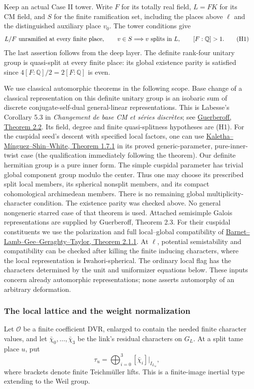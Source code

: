 Keep an actual Case II tower. Write \(F\) for its totally real
field, \(L=FK\) for its CM field, and \(S\) for the finite
ramification set, including the places above \(\ell\) and the
distinguished auxiliary place \(v_0\).
The tower conditions give
\[
 L/F\ \hbox{unramified at every finite place},\qquad
 v\in S\Longrightarrow v\ \hbox{splits in }L,\qquad
 [F:\mathbb Q]>1 .
 \tag{H1}
\]
The last assertion follows from the deep layer.
The definite rank-four unitary group is quasi-split at every
finite place: its global existence parity is satisfied since
\(4[F:\mathbb Q]/2=2[F:\mathbb Q]\) is even.

We use classical automorphic theorems in the following scope.
Base change of a classical representation on this definite
unitary group is an isobaric sum of discrete
conjugate-self-dual general-linear representations.
This is Labesse's Corollary 5.3 in
\emph{Changement de base CM et s\'eries discr\`etes}; see
\href{https://arxiv.org/pdf/0906.4189}{Guerberoff, Theorem 2.2}.
Its field, degree and finite quasi-splitness hypotheses
are (H1).
For the cuspidal seed's descent with specified local factors,
one can use
\href{https://arxiv.org/pdf/1409.3731}
{Kaletha--M\'inguez--Shin--White, Theorem 1.7.1}
in its proved generic-parameter, pure-inner-twist case
(the qualification immediately following the theorem).
Our definite hermitian group is a pure inner form.
The simple cuspidal parameter has trivial global component
group modulo the center. Thus one may choose its prescribed
split local members, its spherical nonsplit members, and
its compact cohomological archimedean members.
There is no remaining global multiplicity-character condition.
The existence parity was checked above. No general
nongeneric starred case of that theorem is used.
Attached semisimple Galois representations are supplied by
Guerberoff, Theorem 2.3.
For their cuspidal constituents we use the polarization and
full local--global compatibility of
\href{https://annals.math.princeton.edu/wp-content/uploads/annals-v179-n2-p03-p.pdf}
{Barnet--Lamb--Gee--Geraghty--Taylor, Theorem 2.1.1}.
At \(\ell\), potential semistability and compatibility can be
checked after killing the finite inducing characters, where
the local representation is Iwahori-spherical.
The ordinary local flag has the characters determined by
the unit and uniformizer equations below.
These inputs concern already automorphic representations;
none asserts automorphy of an arbitrary deformation.

\subsubsection{The local lattice and the weight normalization}
Let \(\mathcal O\) be a finite coefficient DVR, enlarged to contain
the needed finite character values, and let
\(\bar\chi_0,\ldots,\bar\chi_3\) be the link's residual
characters on \(G_L\).
At a split tame place \(u\), put
\[
                 \tau_u=\bigoplus_{i=0}^3
                       [\bar\chi_i]|_{I_{L_w}},
 \tag{H2}
\]
where brackets denote finite Teichm\"uller lifts.
This is a finite-image inertial type extending to the Weil group.

